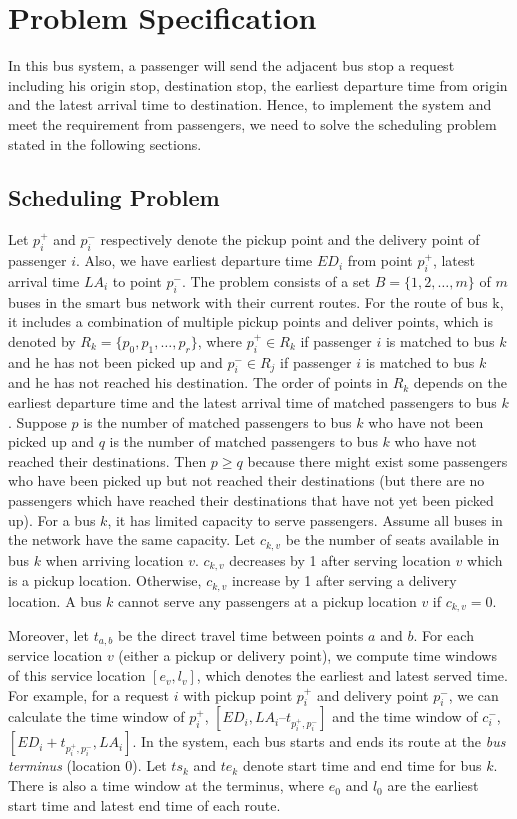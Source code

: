 \documentclass[runningheads]{llncs}
\begin{document}
\section{Problem Specification}
In this bus system, a passenger will send the adjacent bus stop a request including his origin stop, destination stop, the earliest departure time from origin and the latest arrival time to destination. Hence, to implement the system and meet the requirement from passengers, we need to solve the scheduling problem stated in the following sections.

\subsection{Scheduling Problem}
Let $p_i^+$ and $p_i^-$ respectively denote the pickup point and the delivery point of passenger $i$. Also, we have earliest departure time $ED_i$ from point $p_i^+$, latest arrival time $LA_i$ to point $p_i^-$. The problem consists of a set $B = \{1, 2, \dots, m\}$ of $m$ buses in the smart bus network with their current routes. For the route of bus k, it includes a combination of multiple pickup points and deliver points, which is denoted by $R_k = \{p_0, p_1, \dots, p_r\}$, where $p_i^+\in R_k$ if passenger $i$ is matched to bus $k$ and he has not been picked up and $p_i^-\in R_j$ if passenger $i$ is matched to bus $k$ and he has not reached his destination. The order of points in $R_k$ depends on the earliest departure time and the latest arrival time of matched passengers to bus $k$. Suppose $p$ is the number of matched passengers to bus $k$ who have not been picked up and $q$ is the number of matched passengers to bus $k$ who have not reached their destinations. Then $p \geq q$ because there might exist some passengers who have been picked up but not reached their destinations (but there are no passengers which have reached their destinations that have not yet been picked up). For a bus $k$, it has limited capacity to serve passengers. Assume all buses in the network have the same capacity. Let $c_{k,v}$ be the number of seats available in bus $k$ when arriving location $v$. $c_{k,v}$ decreases by 1 after serving location $v$ which is a pickup location. Otherwise, $c_{k,v}$ increase by 1 after serving a delivery location. A bus $k$ cannot serve any passengers at a pickup location $v$ if $c_{k,v} = 0$.

Moreover, let $t_{a,b}$ be the direct travel time between points $a$ and $b$. For each service location $v$ (either a pickup or delivery point), we compute time windows of this service location $[e_v, l_v]$, which denotes the earliest and latest served time. For example, for a request $i$ with pickup point $p_i^+$ and delivery point $p_i^-$, we can calculate the time window of $p_i^+$, $[ED_i, LA_i – t_{p_i^+,p_i^-}]$ and the time window of $c_i^-$, $[ED_i + t_{p_i^+,p_i^-}, LA_i]$. In the system, each bus starts and ends its route at the \emph{bus terminus} (location 0). Let $ts_k$ and $te_k$ denote start time and end time for bus $k$. There is also a time window at the terminus, where $e_0$ and $l_0$ are the earliest start time and latest end time of each route.
\end{document}
